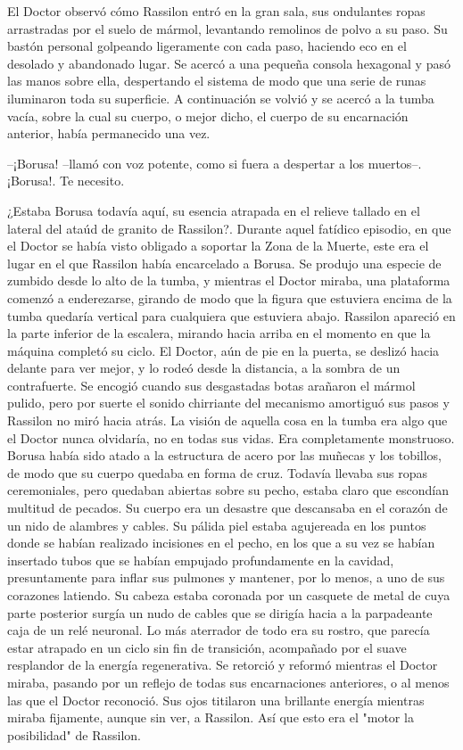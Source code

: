 El Doctor observó cómo Rassilon entró en la gran sala, sus ondulantes ropas arrastradas por el suelo de mármol, levantando remolinos de polvo a su paso. Su bastón personal golpeando ligeramente con cada paso, haciendo eco en el desolado y abandonado lugar. 
Se acercó a una pequeña consola hexagonal y pasó las manos sobre ella, despertando el sistema de modo que una serie de runas iluminaron toda su superficie. A continuación se volvió y se acercó a la tumba vacía, sobre la cual su cuerpo, o mejor dicho, el cuerpo de su encarnación anterior, había permanecido una vez. 

--¡Borusa! --llamó con voz potente, como si fuera a despertar a los muertos--. ¡Borusa!. Te necesito.

¿Estaba Borusa todavía aquí, su esencia atrapada en el relieve tallado en el lateral del ataúd de granito de Rassilon?. Durante aquel fatídico episodio, en que el Doctor se había visto obligado a soportar la Zona de la Muerte, este era el lugar en el que Rassilon había encarcelado a Borusa. 
Se produjo una especie de zumbido desde lo alto de la tumba, y mientras el Doctor miraba, una plataforma comenzó a enderezarse, girando de modo que la figura que estuviera encima de la tumba quedaría vertical para cualquiera que estuviera abajo. 
Rassilon apareció en la parte inferior de la escalera, mirando hacia arriba en el momento en que la máquina completó su ciclo. El Doctor, aún de pie en la puerta, se deslizó hacia delante para ver mejor, y lo rodeó desde la distancia, a la sombra de un contrafuerte. Se encogió cuando sus desgastadas botas arañaron el mármol pulido, pero por suerte el sonido chirriante del mecanismo amortiguó sus pasos y Rassilon no miró hacia atrás. 
La visión de aquella cosa en la tumba era algo que el Doctor nunca olvidaría, no en todas sus vidas. Era completamente monstruoso. Borusa había sido atado a la estructura de acero por las muñecas y los tobillos, de modo que su cuerpo quedaba en forma de cruz. Todavía llevaba sus ropas ceremoniales, pero quedaban abiertas sobre su pecho, estaba claro que escondían multitud de pecados. 
Su cuerpo era un desastre que descansaba en el corazón de un nido de alambres y cables. Su pálida piel estaba agujereada en los puntos donde se habían realizado incisiones en el pecho, en los que a su vez se habían insertado tubos que se habían empujado profundamente en la cavidad, presuntamente para inflar sus pulmones y mantener, por lo menos, a uno de sus corazones latiendo. 
Su cabeza estaba coronada por un casquete de metal de cuya parte posterior surgía un nudo de cables que se dirigía hacia a la parpadeante caja de un relé neuronal. 
Lo más aterrador de todo era su rostro, que parecía estar atrapado en un ciclo sin fin de transición, acompañado por el suave resplandor de la energía regenerativa. Se retorció y reformó mientras el Doctor miraba, pasando por un reflejo de todas sus encarnaciones anteriores, o al menos las que el Doctor reconoció. Sus ojos titilaron una brillante energía mientras miraba fijamente, aunque sin ver, a Rassilon. 
Así que esto era el "motor la posibilidad" de Rassilon. 

